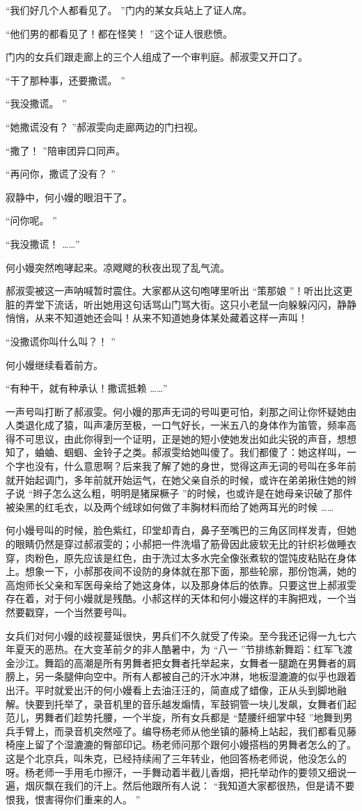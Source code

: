 \documentclass[12pt,twoside,openany]{book}
\begin{document}
“我们好几个人都看见了。 ”门内的某女兵站上了证人席。

“他们男的都看见了！都在怪笑！ ”这个证人很悲愤。

门内的女兵们跟走廊上的三个人组成了一个审判庭。郝淑雯又开口了。

“干了那种事，还要撒谎。 ”

“我没撒谎。 ”

“她撒谎没有？ ”郝淑雯向走廊两边的门扫视。

“撒了！ ”陪审团异口同声。

“再问你，撒谎了没有？ ”

寂静中，何小嫚的眼泪干了。

“问你呢。 ”

“我没撒谎！ ……”

何小嫚突然咆哮起来。凉飕飕的秋夜出现了乱气流。

郝淑雯被这一声呐喊暂时震住。大家都从这句咆哮里听出 “策那娘 ”！听出比这更脏的弄堂下流话，听出她用这句话骂山门骂大街。这只小老鼠一向躲躲闪闪，静静悄悄，从来不知道她还会叫！从来不知道她身体某处藏着这样一声叫！

“没撒谎你叫什么叫？！ ”

何小嫚继续看着前方。

“有种干，就有种承认！撒谎抵赖 ……”

一声号叫打断了郝淑雯。何小嫚的那声无词的号叫更可怕，刹那之间让你怀疑她由人类退化成了猿，叫声凄厉至极，一口气好长，一米五八的身体作为笛管，频率高得不可思议，由此你得到一个证明，正是她的短小使她发出如此尖锐的声音，想想知了，蛐蛐、蝈蝈、金铃子之类。郝淑雯给她叫傻了。我们都傻了：她这样叫，一个字也没有，什么意思啊？后来我了解了她的身世，觉得这声无词的号叫在多年前就开始起调门，多年前就开始运气，在她父亲自杀的时候，或许在弟弟揪住她的辫子说 “辫子怎么这么粗，明明是猪屎橛子 ”的时候，也或许是在她母亲识破了那件被染黑的红毛衣，以及两个绒球如何做了丰胸材料而给了她两耳光的时候 ……

何小嫚号叫的时候，脸色紫红，印堂却青白，鼻子至嘴巴的三角区同样发青，但她的眼睛仍然是穿过郝淑雯的；小郝把一件洗塌了筋骨因此疲软无比的针织衫做睡衣穿，肉粉色，原先应该是红色，由于洗过太多水完全像张煮软的馄饨皮粘贴在身体上。想象一下，小郝那夜间不设防的身体就在那下面，那些轮廓，那份饱满，她的高炮师长父亲和军医母亲给了她这身体，以及那身体后的依靠。只要这世上郝淑雯存在着，对于何小嫚就是残酷。小郝这样的天体和何小嫚这样的丰胸把戏，一个当然要戳穿，一个当然要号叫。

女兵们对何小嫚的歧视蔓延很快，男兵们不久就受了传染。至今我还记得一九七六年夏天的恶热。在大变革前夕的非人酷暑中，为 “八一 ”节排练新舞蹈：红军飞渡金沙江。舞蹈的高潮是所有男舞者把女舞者托举起来，女舞者一腿跪在男舞者的肩膀上，另一条腿伸向空中。所有人都被自己的汗水冲淋，地板湿漉漉的似乎也跟着出汗。平时就爱出汗的何小嫚看上去油汪汪的，简直成了蜡像，正从头到脚地融解。快要到托举了，录音机里的音乐越发煽情，军鼓铜管一块儿发飙，女舞者们起范儿，男舞者们趁势托腰，一个半旋，所有女兵都是 “楚腰纤细掌中轻 ”地舞到男兵手臂上，而录音机突然哑了。编导杨老师从他坐镇的藤椅上站起，我们都看见藤椅座上留了个湿漉漉的臀部印记。杨老师问那个跟何小嫚搭档的男舞者怎么的了。这是个北京兵，叫朱克，已经持续闹了三年转业，他回答杨老师说，他没怎么的呀。杨老师一手用毛巾擦汗，一手舞动着半截儿香烟，把托举动作的要领又细说一遍，烟灰飘在我们的汗上。然后他跟所有人说： “我知道大家都很热，但是请不要恨我，恨害得你们重来的人。 ”
\end{document}
